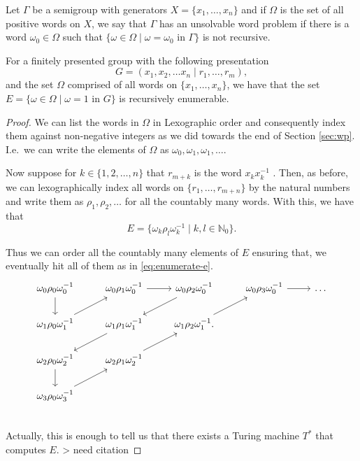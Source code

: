\begin{definition}
  Let $\Gamma$ be a semigroup with generators $X = \{x_1, \dots, x_n\}$ and if $\Omega$ is the set of all positive words on $X$, we say that $\Gamma$ has an unsolvable word problem if there is a word $\omega_0 \in \Omega$ such that $\{\omega \in \Omega \mid \omega = \omega_0 \text{ in } \Gamma\}$ is not recursive.
\end{definition}

\begin{theorem}
  \label{thm:semi-re}
  For a finitely presented group with the following presentation
  \begin{equation*}
    G = (x_1, x_2, \dots x_n \mid r_1, \dots, r_m), 
  \end{equation*}
  and the set $\Omega$ comprised of all words on $\{x_1, \dots, x_n \}$, we have that the set $E = \{\omega \in \Omega \mid \omega = 1 \text{ in } G\}$ is recursively enumerable.
\end{theorem}

\begin{proof}
  We can list the words in $\Omega$ in Lexographic order and consequently index them against non-negative integers as we did towards the end of Section \ref{sec:wp}. I.e.\ we can write the elements of $\Omega$ as $\omega_0, \omega_1, \omega_1, \dots$.
  
  Now suppose for $k \in \{1,2,\dots,n\}$ that $r_{m+k}$ is the word $x_k x_k^{-1}$ . Then, as before, we can lexographically index all words on $\{ r_1, \dots, r_{m+n}\}$ by the natural numbers and write them as $\rho_1,\rho_2, \dots$ for all the countably many words. With this, we have that
  \begin{equation*}
    E = \{\omega_k\rho_l\omega_k^{-1} \mid k,l \in \mathbb{N}_0\}.
  \end{equation*}

  Thus we can order all the countably many elements of $E$ ensuring that, we eventually hit all of them as in \ref{eq:enumerate-e}.
  \begin{equation}
    \label{eq:enumerate-e}
    \begin{tikzcd}
      \omega_0\rho_0\omega_0^{-1} \arrow[d] & \omega_0\rho_1\omega_0^{-1} \arrow[r] & \omega_0\rho_2\omega_0^{-1} \arrow[dl] & \omega_0\rho_3\omega_0^{-1}\arrow[r] & \dots \\
      \omega_1\rho_0\omega_1^{-1} \arrow[ur] & \omega_1\rho_1\omega_1^{-1} \arrow[dl]  & \omega_1\rho_2\omega_1^{-1} \arrow[ur]. \\
      \omega_2\rho_0\omega_2^{-1} \arrow[d]& \omega_2\rho_1\omega_2^{-1} \arrow[ur] \\
      \omega_3\rho_0\omega_3^{-1} \arrow[ur]\\
    \end{tikzcd}
  \end{equation}
  Actually, this is enough to tell us that there exists a Turing machine $T^*$ that computes $E$. > need citation
\end{proof}

